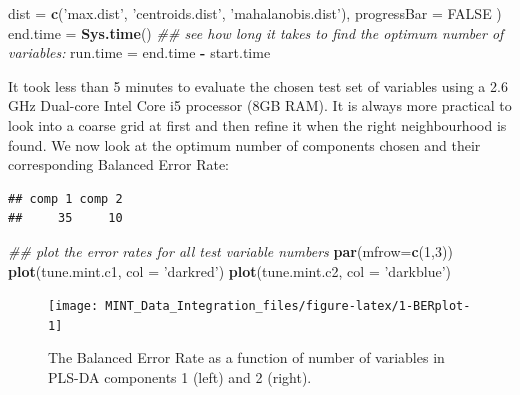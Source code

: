\documentclass[]{book}
\newenvironment{Shaded}{\begin{snugshade}}{\end{snugshade}}
\newcommand{\CommentTok}[1]{\textcolor[rgb]{0.56,0.35,0.01}{\textit{#1}}}
\newcommand{\DataTypeTok}[1]{\textcolor[rgb]{0.13,0.29,0.53}{#1}}
\newcommand{\DecValTok}[1]{\textcolor[rgb]{0.00,0.00,0.81}{#1}}
\newcommand{\KeywordTok}[1]{\textcolor[rgb]{0.13,0.29,0.53}{\textbf{#1}}}
\newcommand{\NormalTok}[1]{#1}
\newcommand{\OperatorTok}[1]{\textcolor[rgb]{0.81,0.36,0.00}{\textbf{#1}}}
\newcommand{\OtherTok}[1]{\textcolor[rgb]{0.56,0.35,0.01}{#1}}
\newcommand{\StringTok}[1]{\textcolor[rgb]{0.31,0.60,0.02}{#1}}
\theoremstyle{definition}
\theoremstyle{definition}
\theoremstyle{definition}
\theoremstyle{remark}
\begin{document}
\begin{Shaded}
\begin{Highlighting}[]
  \DataTypeTok{dist =} \KeywordTok{c}\NormalTok{(}\StringTok{'max.dist'}\NormalTok{,  }\StringTok{'centroids.dist'}\NormalTok{, }\StringTok{'mahalanobis.dist'}\NormalTok{),}
  \DataTypeTok{progressBar =} \OtherTok{FALSE}
\NormalTok{)}
\NormalTok{end.time =}\StringTok{ }\KeywordTok{Sys.time}\NormalTok{()}
\CommentTok{## see how long it takes to find the optimum number of variables:}
\NormalTok{run.time =}\StringTok{  }\NormalTok{end.time }\OperatorTok{-}\StringTok{ }\NormalTok{start.time}
\end{Highlighting}
\end{Shaded}

It took less than 5 minutes to evaluate the chosen test set of variables
using a 2.6 GHz Dual-core Intel Core i5 processor (8GB RAM). It is
always more practical to look into a coarse grid at first and then
refine it when the right neighbourhood is found. We now look at the
optimum number of components chosen and their corresponding Balanced
Error Rate:

\begin{Shaded}
\end{Shaded}

\begin{verbatim}
## comp 1 comp 2 
##     35     10
\end{verbatim}

\begin{Shaded}
\begin{Highlighting}[]
\CommentTok{## plot the error rates for all test variable numbers}
\KeywordTok{par}\NormalTok{(}\DataTypeTok{mfrow=}\KeywordTok{c}\NormalTok{(}\DecValTok{1}\NormalTok{,}\DecValTok{3}\NormalTok{))}
\KeywordTok{plot}\NormalTok{(tune.mint.c1, }\DataTypeTok{col =} \StringTok{'darkred'}\NormalTok{)}
\KeywordTok{plot}\NormalTok{(tune.mint.c2, }\DataTypeTok{col =} \StringTok{'darkblue'}\NormalTok{)}
\end{Highlighting}
\end{Shaded}

\begin{figure}[ht]

\texttt{[image: MINT\_Data\_Integration\_files/figure-latex/1-BERplot-1]} \hfill{}

\caption{The Balanced Error Rate as a function of number of variables in PLS-DA components 1 (left) and 2 (right). }\label{fig:1-BERplot}
\end{figure}
\end{document}
